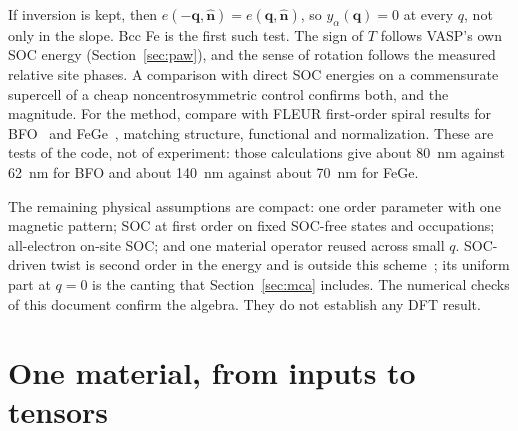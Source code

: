 \documentclass[11pt,a4paper]{article}
\numberwithin{equation}{section}
\newcommand{\vct}[1]{\bm{#1}}
\newcommand{\nh}{\hat{\vct n}}
\newcommand{\qh}{\vct q}
\begin{document}
\begin{description}[style=nextline,leftmargin=0pt,labelsep=0pt]
\item[Nulls and anchors: is the result physically right?]
If inversion is kept, then $e(-\qh,\nh)=e(\qh,\nh)$, so $y_\alpha(\qh)=0$ at every
$q$, not only in the slope. Bcc Fe is the first such test. The sign of $T$
follows VASP's own SOC energy (Section~\ref{sec:paw}), and the sense of rotation
follows the measured relative site phases. A comparison with direct SOC
energies on a commensurate supercell of a cheap noncentrosymmetric control
confirms both, and the magnitude. For the method,
compare with FLEUR first-order spiral results for BFO~\cite{xu} and
FeGe~\cite{grytsiuk}, matching structure, functional and normalization. These are
tests of the code, not of experiment: those calculations give about 80~nm against
62~nm for BFO and about 140~nm against about 70~nm for FeGe.
\end{description}

The remaining physical assumptions are compact: one order parameter with one
magnetic pattern; SOC at first order on fixed SOC-free states and occupations;
all-electron on-site SOC; and one material operator reused across small $q$.
SOC-driven twist is second order in the energy and is outside this
scheme~\cite{twisted}; its uniform part at $q=0$ is the canting that
Section~\ref{sec:mca} includes. The numerical checks of this document confirm the algebra.
They do not establish any DFT result.

\section{One material, from inputs to tensors}\label{sec:walkthrough}
\end{document}

